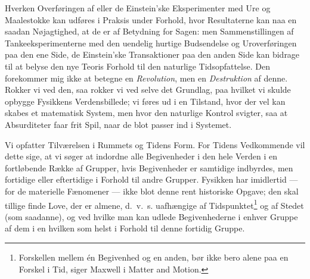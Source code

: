 \documentclass[12pt,a4paper]{article}
\newcommand{\opage}[1]{\marginnote{\footnotesize\textit{[#1]}}}
\begin{document}
Hverken Overføringen af eller de Einstein'ske Eksperimenter med Ure og
Maalestokke kan udføres i Praksis under Forhold, hvor Resultaterne kan naa en
saadan Nøjagtighed, at de er af Betydning for Sagen: men Sammenstillingen af
Tankeeksperimenterne med den uendelig hurtige Budsendelse og Uroverføringen paa
den ene Side, de Einstein'ske Transaktioner paa den anden Side kan bidrage til
at belyse den nye Teoris Forhold til den naturlige Tidsopfattelse. Den
\opage{7} forekommer mig ikke at betegne en \emph{Revolution}, men en
\emph{Destruktion} af denne. Rokker vi ved den, saa rokker vi ved selve det
Grundlag, paa hvilket vi skulde opbygge Fysikkens Verdensbillede; vi føres ud i
en Tilstand, hvor der vel kan skabes et matematisk System, men hvor den
naturlige Kontrol svigter, saa at Absurditeter faar frit Spil, naar de blot
passer ind i Systemet.

Vi opfatter Tilværelsen i Rummets og Tidens Form. For Tidens Vedkommende vil
dette sige, at vi søger at indordne alle Begivenheder i den hele Verden i en
fortløbende Række af Grupper, hvis Begivenheder er samtidige indbyrdes, men
fortidige eller eftertidige i Forhold til andre Grupper. Fysikken har
imidlertid --- for de materielle Fænomener --- ikke blot denne rent historiske
Opgave; den skal tillige finde Love, der er almene, d.~v.~s. uafhængige af
Tidspunktet\footnote{\guillemotright Forskellen mellem én Begivenhed og en
anden, bør ikke bero alene paa en Forskel i Tid\guillemotleft, siger Maxwell i
\guillemotright Matter and Motion\guillemotleft.} og af Stedet (som saadanne),
og ved hvilke man kan udlede Begivenhederne i enhver Gruppe af dem i en hvilken
som helst i Forhold til denne fortidig Gruppe.
\end{document}
